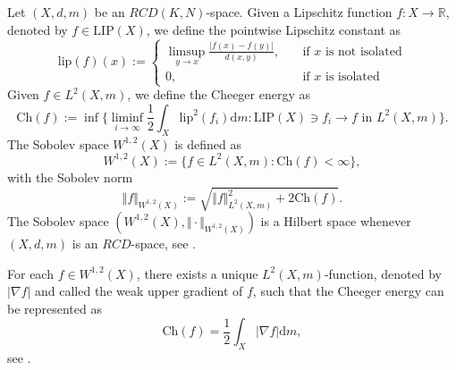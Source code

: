 \documentclass{article}
\theoremstyle{remark}
\numberwithin{equation}{section}
\theoremstyle{definition}
\begin{document}
     Let $(X,d,m)$ be an $RCD(K,N)$-space. Given a Lipschitz function $f : X \to \mathbb{R}$, denoted by $f \in \mathrm{LIP}(X)$, we define the pointwise Lipschitz constant as 
     \begin{equation}
     	\mathrm{lip}(f)(x) := \begin{cases}
     		\limsup_{y \to x} \frac{\lvert f(x) - f(y)\rvert}{d(x,y)},\quad & \text{if } x \text{ is not isolated}\\
     		0,\quad & \text{if } x \text{ is isolated}
     	\end{cases}
     \end{equation}
     Given $f \in L^{2}(X,m)$, we define the Cheeger energy as
     \begin{equation}
     	\mathrm{Ch}(f) := \inf \{ \liminf_{i \to \infty} \frac{1}{2} \int_{X} \mathrm{lip}^{2}(f_{i}) \mathrm{d}m : \mathrm{LIP}(X) \ni f_{i} \to f \text{ in } L^{2}(X,m)\}.
     \end{equation}
     The Sobolev space $W^{1,2}(X)$ is defined as
     \begin{equation}
     	W^{1,2}(X) := \{f \in L^{2}(X,m) : \mathrm{Ch}(f) < \infty\},
     \end{equation}
     with the Sobolev norm 
     \begin{equation}
     	\Vert f \Vert_{W^{1,2}(X)} := \sqrt{\Vert f \Vert^{2}_{L^{2}(X,m)} + 2\mathrm{Ch}(f)}.
     \end{equation}
     The Sobolev space $(W^{1,2}(X),\Vert \cdot \Vert_{W^{1,2}(X)})$ is a Hilbert space whenever $(X,d,m)$ is an $RCD$-space, see \cite[Proposition 4.10, Theorem 5.1]{Ambrosio-Gigli-Savare_2014}.
     
     For each $f \in W^{1,2}(X)$, there exists a unique $L^{2}(X,m)$-function, denoted by $\lvert \nabla f \rvert$ and called the weak upper gradient of $f$, such that the Cheeger energy can be represented as 
     \begin{equation}
     	\mathrm{Ch}(f) = \frac{1}{2} \int_{X} \left| \nabla f \right| \mathrm{d}m,
     \end{equation}
     see \cite[Section 2]{Cheeger_1999}.
     
\end{document}
